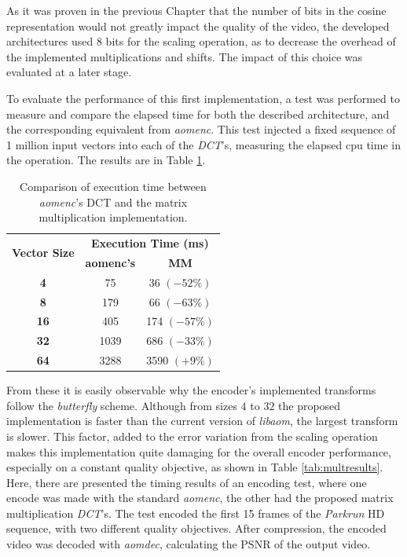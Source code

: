 As it was proven in the previous Chapter that the number of bits in the cosine representation would not greatly impact the quality of the video, the developed architectures used 8 bits for the scaling operation, as to decrease the overhead of the implemented multiplications and shifts. The impact of this choice was evaluated at a later stage.

To evaluate the performance of this first implementation, a test was performed to measure and compare the elapsed time for both the described architecture, and the corresponding equivalent from \emph{aomenc}. This test injected a fixed sequence of 1 million input vectors into each of the \emph{DCT}'s,  measuring the elapsed cpu time in the operation. The results are in Table \ref{tab:dcttime}.

\begin{table}[!htpb]
    \centering
    \caption{Comparison of execution time between \emph{aomenc}'s DCT and the matrix multiplication implementation.}
    \begin{tabular}{ccc} \toprule
        \multirow{2}{*}{\textbf{Vector Size}} &     \multicolumn{2}{c}{\textbf{Execution Time (ms)}} \\
         &      \textbf{aomenc's} &      \textbf{MM} \\ \toprule
        \textbf{4} &    75 &       36 $(-52\%)$ \\ \hline
        \textbf{8} &    179 &      66 $(-63\%)$ \\ \hline
        \textbf{16} &   405 &      174 $(-57\%)$ \\ \hline
        \textbf{32} &   1039 &     686 $(-33\%)$  \\ \hline
        \textbf{64} &   3288 &     3590 $(+9\%)$  \\ 
        \bottomrule
    \end{tabular}    
    \label{tab:dcttime}
\end{table}

From these it is easily observable why the encoder's implemented transforms follow the \emph{butterfly} scheme. Although from sizes $4$ to $32$ the proposed implementation is faster than the current version of \emph{libaom}, the largest transform is slower. This factor, added to the error variation from the scaling operation makes this implementation quite damaging for the overall encoder performance, especially on a constant quality objective, as shown in Table \ref{tab:multresults}. Here, there are presented the timing results of an encoding test, where one encode was made with the standard \emph{aomenc}, the other had the proposed matrix multiplication \emph{DCT}'s. The test encoded the first 15 frames of the \emph{Parkrun} HD sequence, with two different quality objectives. After compression, the encoded video was decoded with \emph{aomdec}, calculating the PSNR of the output video.

